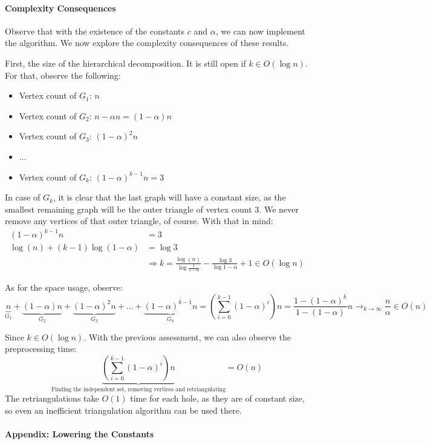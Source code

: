\documentclass[10pt]{article}
\theoremstyle{definition}
\theoremstyle{remark}
\begin{document}
\paragraph{Complexity Consequences}

Observe that with the existence of the constants \(c\) and \(\alpha\), we can now implement the algorithm. We now explore the complexity consequences of these results.

First, the size of the hierarchical decomposition. It is still open if \(k \in O(\log{n})\). For that, observe the following:
\begin{itemize}
    \item Vertex count of \(G_1\): \(n\)
    \item Vertex count of \(G_2\): \(n - \alpha n = (1-\alpha) n\)
    \item Vertex count of \(G_3\): \((1-\alpha)^2 n\)
    \item ...
    \item Vertex count of \(G_k\): \((1-\alpha)^{k-1} n = 3\)
\end{itemize}
In case of \(G_k\), it is clear that the last graph will have a constant size, as the smallest remaining graph will be the outer triangle of vertex count 3. We never remove any vertices of that outer triangle, of course. With that in mind:
\begin{align*}
    (1-\alpha)^{k-1} n &= 3\\
    \log(n) + (k-1)\log(1-\alpha) &= \log{3}\\
    &\Rightarrow k =  \frac{\log(n)}{\log{\frac{1}{1-\alpha}}} - \frac{\log{3}}{\log{1-\alpha}} + 1 \in O(\log{n})
\end{align*}

As for the space usage, observe:
\[
    \underbrace{n}_{G_1} + \underbrace{(1-\alpha) n}_{G_2} + \underbrace{(1-\alpha)^2 n}_{G_3} + ... + \underbrace{(1-\alpha)^{k-1} n}_{G_k} = \left(\sum_{i=0}^{k-1} (1-\alpha)^i\right) n = \frac{1-(1-\alpha)^{k}}{1-(1-\alpha)} n \longrightarrow_{k\to\infty} \frac{n}{\alpha} \in O(n)
\]

Since \(k \in O(\log{n})\). With the previous assessment, we can also observe the preprocessing time:
\[
    \underbrace{\left(\sum_{i=0}^{k-1} (1-\alpha)^i\right) n}_{\text{Finding the independent set, removing vertices and retriangulating}} = O(n)
\]
The retriangulations take \(O(1)\) time for each hole, as they are of constant size, so even an inefficient triangulation algorithm can be used there.

\paragraph{Appendix: Lowering the Constants}
\end{document}
